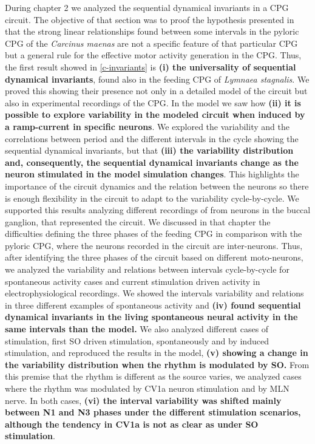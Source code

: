 During chapter 2 we analyzed the sequential dynamical invariants in a CPG circuit. The objective of that section was to proof the hypothesis presented in \cite{elices_robust_2019} that the strong linear relationships found between some intervals in the pyloric CPG of the \textit{Carcinus maenas} are not a specific feature of that particular CPG but a general rule for the effective motor activity generation in the CPG. Thus, the first result showed in \ref{c-invariants} is \textbf{(i) the universality of sequential dynamical invariants}, found also in the feeding CPG of \textit{Lymnaea stagnalis}. We proved this showing their presence not only in a detailed model of the circuit but also in experimental recordings of the CPG. In the model we saw how \textbf{(ii) it is possible to explore variability in the modeled circuit when induced by a ramp-current in specific neurons}. We explored the variability and the correlations between period and the different intervals in the cycle showing the sequential dynamical invariants, but that \textbf{(iii) the variability distribution and, consequently, the sequential dynamical invariants change as the neuron stimulated in the model simulation changes}. This highlights the importance of the circuit dynamics and the relation between the neurons so there is enough flexibility in the circuit to adapt to the variability cycle-by-cycle. We supported this results analyzing different recordings of from neurons in the buccal ganglion, that represented the circuit. We discussed in that chapter the difficulties defining the three phases of the feeding CPG in comparison with the pyloric CPG, where the neurons recorded in the circuit are inter-neurons. Thus, after identifying the three phases of the circuit based on different moto-neurons, we analyzed the variability and relations between intervals cycle-by-cycle for spontaneous activity cases and current stimulation driven activity in electrophysiological recordings. We showed the intervals variability and relations in three different examples of spontaneous activity and \textbf{(iv) found sequential dynamical invariants in the living spontaneous neural activity in the same intervals than the model.} We also analyzed different cases of stimulation, first SO driven stimulation, spontaneously and by induced stimulation, and reproduced the results in the model, \textbf{(v) showing a change in the variability distribution when the rhythm is modulated by SO.} From this premise that the rhythm is different as the source varies, we analyzed cases where the rhythm was modulated by CV1a neuron stimulation and by MLN nerve. In both cases, \textbf{(vi) the interval variability was shifted mainly between N1 and N3 phases under the different stimulation scenarios, although the tendency in CV1a is not as clear as under SO stimulation}.

